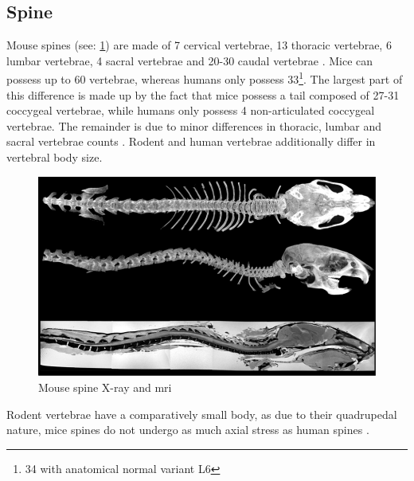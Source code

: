 \subsection{Spine}
\label{s:b-mouse-spine}
Mouse spines (see: \cref{fig:mouseSpine}) are made of 7 cervical vertebrae, 13 thoracic vertebrae, 6 lumbar vertebrae, 4 sacral vertebrae and 20-30 caudal vertebrae \cite{platzerTaschenatlasAnatomieBd2013}.
Mice can possess up to 60 vertebrae, whereas humans only possess 33\footnote{34 with anatomical normal variant L6}.
The largest part of this difference is made up by the fact that mice possess a tail composed of 27-31 coccygeal vertebrae,
while humans only possess 4 non-articulated coccygeal vertebrae.
The remainder is due to minor differences in thoracic, lumbar and sacral vertebrae counts \cite{ruberteMorphologicalMousePhenotyping2017,jeromeSkeletalSystem2018,harrisonVertebralLandmarksIdentification2013}.
Rodent and human vertebrae additionally differ in vertebral body size.
\begin{figure}[h]
	\centerline{
		\includegraphics[scale=0.7]{images/mouseSpine.png}}
	\caption{Mouse spine X-ray and \acrshort{mri} \cite{harrisonVertebralLandmarksIdentification2013}}\label{fig:mouseSpine}
\end{figure}

\noindent
Rodent vertebrae have a comparatively small body, as due to their quadrupedal nature,
mice spines do not undergo as much axial stress as human spines \cite{ruberteMorphologicalMousePhenotyping2017,jeromeSkeletalSystem2018,platzerTaschenatlasAnatomieBd2013}.

